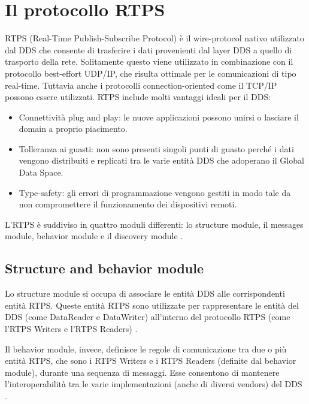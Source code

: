 \section{Il protocollo RTPS}
RTPS (Real-Time Publish-Subscribe Protocol) è il wire-protocol 
nativo utilizzato dal DDS che consente di trasferire i dati provenienti
dal layer DDS a quello di trasporto della rete.
Solitamente questo viene utilizzato in combinazione con il protocollo
best-effort
UDP/IP, che risulta ottimale per le comunicazioni di tipo real-time. Tuttavia 
anche i protocolli connection-oriented come il TCP/IP possono essere utilizzati. 
RTPS include molti vantaggi ideali per il DDS:
\begin{itemize}
    \item Connettività plug and play: le nuove applicazioni possono unirsi o 
    lasciare il domain a proprio piacimento.
    \item Tolleranza ai guasti: non sono presenti singoli punti di 
    guasto perché i dati vengono distribuiti e replicati tra le varie 
    entità DDS che adoperano il Global Data Space.
    \item Type-safety: gli errori di programmazione vengono gestiti 
    in modo tale da non compromettere il funzionamento 
    dei dispositivi remoti.
\end{itemize}
L'RTPS è suddiviso in quattro moduli differenti: lo structure module, il 
messages module, behavior module e il discovery module \cite{ddsrtps}.

\subsection{Structure and behavior module}
Lo structure module si occupa di associare le entità DDS alle corrispondenti
entità RTPS. Queste entità RTPS sono utilizzate 
per rappresentare le entità del DDS (come DataReader e DataWriter) 
all'interno del protocollo RTPS (come l'RTPS Writers e l'RTPS Readers) 
\cite{ddsrtps}.

Il behavior module, invece, definisce le regole di comunicazione tra
due o più entità RTPS, che sono i RTPS Writers e i RTPS Readers 
(definite dal behavior module), durante 
una sequenza di messaggi.
Esse consentono di mantenere l'interoperabilità tra le varie 
implementazioni (anche di diversi vendors) del DDS \cite{ddsrtps}.

